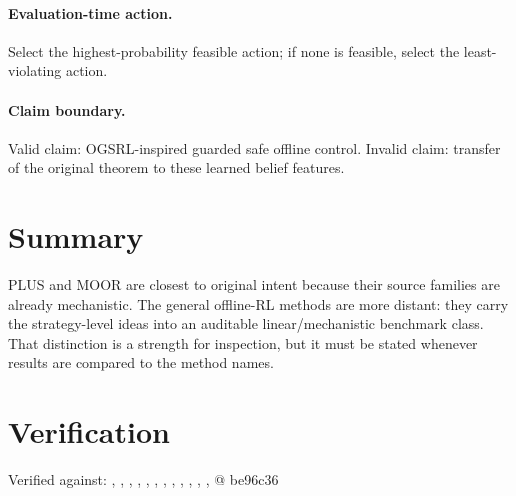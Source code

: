 \documentclass[11pt]{article}
\begin{document}
\paragraph{Evaluation-time action.}
Select the highest-probability feasible action; if none is feasible, select the
least-violating action.

\paragraph{Claim boundary.}
Valid claim: OGSRL-inspired guarded safe offline control. Invalid claim:
transfer of the original theorem to these learned belief features.

\section{Summary}

PLUS and MOOR are closest to original intent because their source families are
already mechanistic. The general offline-RL methods are more distant: they carry
the strategy-level ideas into an auditable linear/mechanistic benchmark class.
That distinction is a strength for inspection, but it must be stated whenever
results are compared to the method names.

\section*{Verification}

Verified against: , , , , , , , , , , , ,  @ be96c36
\end{document}
